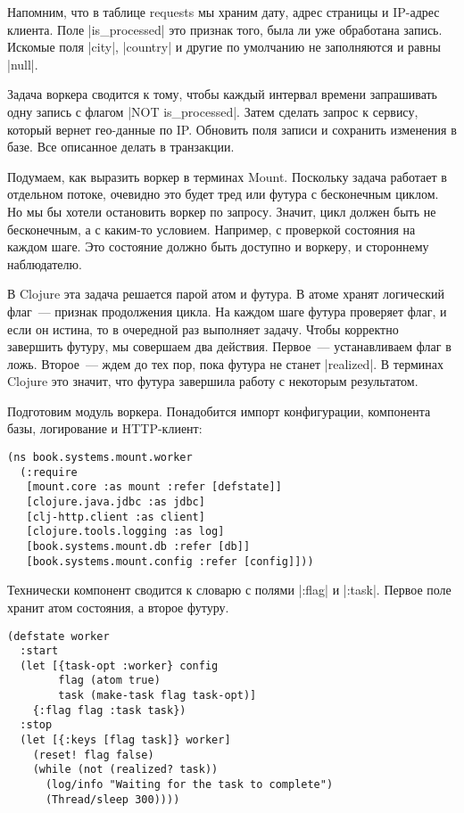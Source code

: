 Напомним, что в таблице requests мы храним дату, адрес страницы и IP-адрес
клиента. Поле \spverb|is_processed| это признак того, была ли уже обработана
запись. Искомые поля \spverb|city|, \spverb|country| и другие по умолчанию не заполняются и
равны \spverb|null|.

Задача воркера сводится к тому, чтобы каждый интервал времени запрашивать одну
запись с флагом \spverb|NOT is_processed|. Затем сделать запрос к сервису, который
вернет гео-данные по IP. Обновить поля записи и сохранить изменения в базе. Все
описанное делать в транзакции.

Подумаем, как выразить воркер в терминах Mount. Поскольку задача работает в
отдельном потоке, очевидно это будет тред или футура с бесконечным циклом. Но мы
бы хотели остановить воркер по запросу. Значит, цикл должен быть не бесконечным,
а с каким-то условием. Например, с проверкой состояния на каждом шаге. Это
состояние должно быть доступно и воркеру, и стороннему наблюдателю.

В Clojure эта задача решается парой атом и футура. В атоме хранят логический
флаг~--- признак продолжения цикла. На каждом шаге футура проверяет флаг, и если
он истина, то в очередной раз выполняет задачу. Чтобы корректно завершить
футуру, мы совершаем два действия. Первое~--- устанавливаем флаг в ложь. Второе~---
ждем до тех пор, пока футура не станет \spverb|realized|. В терминах Clojure это
значит, что футура завершила работу с некоторым результатом.

Подготовим модуль воркера. Понадобится импорт конфигурации, компонента базы,
логирование и HTTP-клиент:

\begin{verbatim}
(ns book.systems.mount.worker
  (:require
   [mount.core :as mount :refer [defstate]]
   [clojure.java.jdbc :as jdbc]
   [clj-http.client :as client]
   [clojure.tools.logging :as log]
   [book.systems.mount.db :refer [db]]
   [book.systems.mount.config :refer [config]]))
\end{verbatim}

Технически компонент сводится к словарю с полями \spverb|:flag| и \spverb|:task|. Первое поле
хранит атом состояния, а второе футуру.

\begin{verbatim}
(defstate worker
  :start
  (let [{task-opt :worker} config
        flag (atom true)
        task (make-task flag task-opt)]
    {:flag flag :task task})
  :stop
  (let [{:keys [flag task]} worker]
    (reset! flag false)
    (while (not (realized? task))
      (log/info "Waiting for the task to complete")
      (Thread/sleep 300))))
\end{verbatim}

